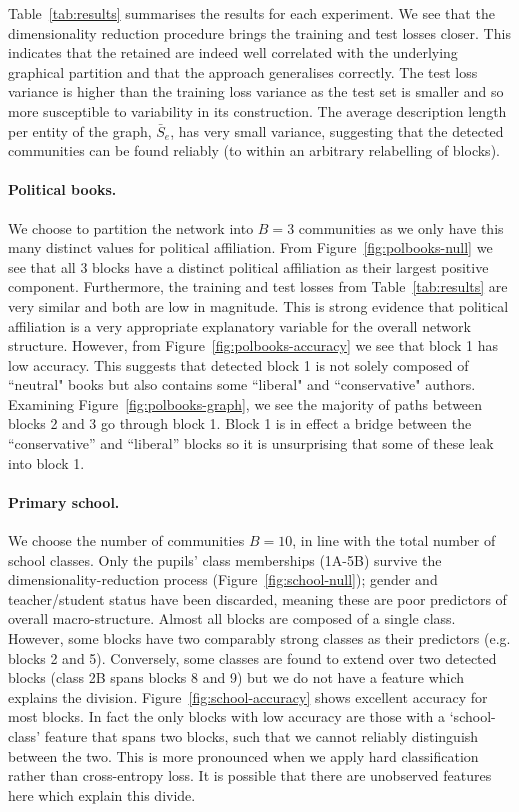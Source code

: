 Table~\ref{tab:results} summarises the results for each experiment. 
We see that the dimensionality reduction procedure 
brings the training and test losses closer. This indicates that 
the retained
are indeed well correlated with the underlying graphical 
partition and that the approach generalises correctly. The test loss variance is higher than the training loss variance as the test set is smaller and so more susceptible to variability in its construction.
%
The average description length per entity of the graph,
$\bar{S}_e$,
has very small variance, suggesting that
the detected communities can be found reliably (to within an arbitrary 
relabelling of blocks).

\paragraph{\textbf{Political books.}}

We choose to partition the network into $B=3$ communities as we only have this many distinct values for political affiliation.
From Figure~\ref{fig:polbooks-null} we see that all 3 blocks have a distinct political affiliation as their largest positive component.  
Furthermore, the training and test losses from Table~\ref{tab:results}  
are very similar and both are low in magnitude. This is strong evidence 
that political affiliation is a very appropriate explanatory 
variable for the overall network structure.
%
However, from Figure~\ref{fig:polbooks-accuracy} we see that block 1 has low accuracy. 
This suggests that detected block 1 is not solely composed of ``neutral" books but also 
contains some ``liberal" and ``conservative" authors. Examining 
Figure~\ref{fig:polbooks-graph}, we see the majority of paths between blocks 2 and 3 go through block 1.
Block 1 is in effect a bridge between the ``conservative'' and ``liberal'' blocks so it is unsurprising that some of these leak into block 1.

\paragraph{\textbf{Primary school.}}

We choose the number of communities $B=10$, in line with the total number of 
school classes. Only the pupils' class memberships (1A-5B) survive
the dimensionality-reduction process (Figure~\ref{fig:school-null});
gender and teacher/student status have been discarded,
meaning these are poor predictors of overall macro-structure.
%
Almost all blocks are composed of a single class. 
However, some blocks have two comparably strong classes as their predictors (e.g. blocks 2 and 5). 
Conversely, some classes are found to extend over two 
detected blocks (class 2B spans blocks 8 and 9) but we do 
not have a feature which explains the division.
%
Figure~\ref{fig:school-accuracy} shows excellent accuracy for most blocks. In fact the only blocks with low accuracy are those with a `school-class'
feature that spans two blocks, such that we cannot reliably distinguish between the two. This is more pronounced when we apply hard classification rather than cross-entropy loss. It is possible that there are unobserved features here
which explain this divide.

